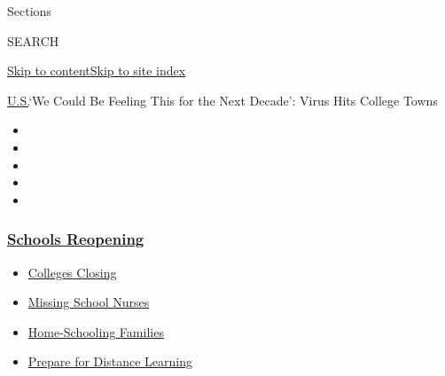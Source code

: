 Sections

SEARCH

\protect\hyperlink{site-content}{Skip to
content}\protect\hyperlink{site-index}{Skip to site index}

\href{/section/us}{U.S.}\textbar{}`We Could Be Feeling This for the Next
Decade': Virus Hits College Towns

\begin{itemize}
\item
\item
\item
\item
\item
\end{itemize}

\hypertarget{schools-reopening}{%
\subsubsection{\texorpdfstring{\href{https://www.nytimes3xbfgragh.onion/spotlight/schools-reopening?name=styln-coronavirus-schools-reopening\&region=TOP_BANNER\&variant=undefined\&block=storyline_menu_recirc\&action=click\&pgtype=Article\&impression_id=be448c10-e39f-11ea-9027-41a96f0fd4e9}{Schools
Reopening}}{Schools Reopening}}\label{schools-reopening}}

\begin{itemize}
\tightlist
\item
  \href{https://www.nytimes3xbfgragh.onion/2020/08/19/us/colleges-closing-covid.html?name=styln-coronavirus-schools-reopening\&region=TOP_BANNER\&variant=undefined\&block=storyline_menu_recirc\&action=click\&pgtype=Article\&impression_id=be448c11-e39f-11ea-9027-41a96f0fd4e9}{Colleges
  Closing}
\item
  \href{https://www.nytimes3xbfgragh.onion/2020/08/20/us/schools-reopening-nurses-covid.html?name=styln-coronavirus-schools-reopening\&region=TOP_BANNER\&variant=undefined\&block=storyline_menu_recirc\&action=click\&pgtype=Article\&impression_id=be448c12-e39f-11ea-9027-41a96f0fd4e9}{Missing
  School Nurses}
\item
  \href{https://www.nytimes3xbfgragh.onion/2020/08/18/parenting/homeschool-families.html?name=styln-coronavirus-schools-reopening\&region=TOP_BANNER\&variant=undefined\&block=storyline_menu_recirc\&action=click\&pgtype=Article\&impression_id=be448c13-e39f-11ea-9027-41a96f0fd4e9}{Home-Schooling
  Families}
\item
  \href{https://www.nytimes3xbfgragh.onion/2020/08/05/parenting/parents-distance-learning.html?name=styln-coronavirus-schools-reopening\&region=TOP_BANNER\&variant=undefined\&block=storyline_menu_recirc\&action=click\&pgtype=Article\&impression_id=be44b320-e39f-11ea-9027-41a96f0fd4e9}{Prepare
  for Distance Learning}
\end{itemize}

